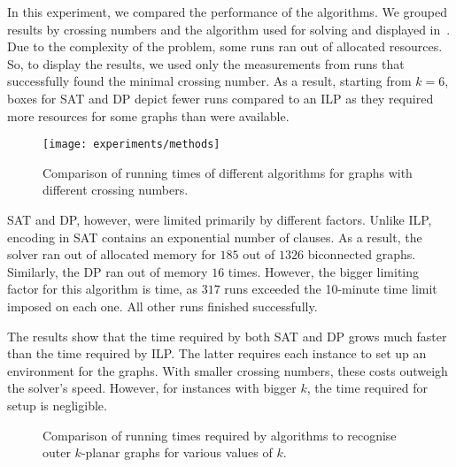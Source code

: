 In this experiment, we compared the performance of the algorithms. We grouped results by crossing numbers and the algorithm used for solving and displayed in~. Due to the complexity of the problem, some runs ran out of allocated resources. So, to display the results, we used only the measurements from runs that successfully found the minimal crossing number. As a result, starting from \(k = 6\), boxes for \textsf{SAT} and \textsf{DP} depict fewer runs compared to an \textsf{ILP} as they required more resources for some graphs than were available.

\begin{figure}[tbh]
    \centering
    \texttt{[image: experiments/methods]}
    \caption{Comparison of running times of different algorithms for graphs with different crossing numbers.}
    \label{fig:methods}
\end{figure}

\textsf{SAT} and \textsf{DP}, however, were limited primarily by different factors. Unlike \textsf{ILP}, encoding in \textsf{SAT} contains an exponential number of clauses. As a result, the solver ran out of allocated memory for \(185\) out of \(1326\) biconnected graphs. Similarly, the \textsf{DP} ran out of memory \(16\) times. However, the bigger limiting factor for this algorithm is time, as \(317\) runs exceeded the 10-minute time limit imposed on each one. All other runs finished successfully.

The results show that the time required by both \textsf{SAT} and \textsf{DP} grows much faster than the time required by \textsf{ILP}. The latter requires each instance to set up an environment for the graphs. With smaller crossing numbers, these costs outweigh the solver's speed. However, for instances with bigger \(k\), the time required for setup is negligible.

\begin{figure}[tbh]
    \centering
     \hfill
     \hfill
     \hfill
     \hfill
    \caption{Comparison of running times required by algorithms to recognise outer \(k\)-planar graphs for various values of \(k\).}
    \label{fig:methods-vertices}
\end{figure}

